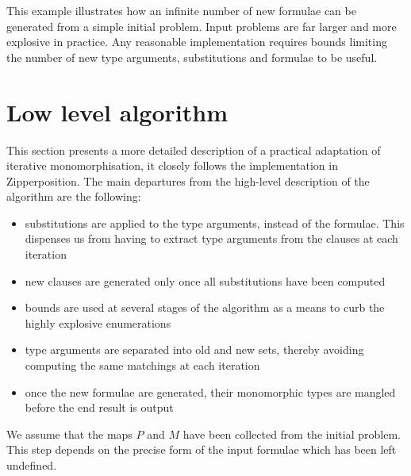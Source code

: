 \documentclass[]{ceurart}
\begin{document}
This example illustrates how an infinite number of new formulae can be generated from a simple initial problem. Input problems are far larger and more explosive in practice. Any reasonable implementation requires bounds limiting the number of new type arguments, substitutions and formulae to be useful.

\section{Low level algorithm}
\label{sec:low-level-algorithm}

This section presents a more detailed description of a practical adaptation of iterative monomorphisation, it closely follows the implementation in Zipperposition. The main departures from the high-level description of the algorithm are the following:
\begin{itemize}
   \item substitutions are applied to the type arguments, instead of the formulae. This dispenses us from having to extract type arguments from the clauses at each iteration
   \item new clauses are generated only once all substitutions have been computed
   \item bounds are used at several stages of the algorithm as a means to curb the highly explosive enumerations
   \item type arguments are separated into old and new sets, thereby avoiding computing the same matchings at each iteration
   \item once the new formulae are generated, their monomorphic types are mangled before the end result is output
\end{itemize}

We assume that the maps \(P\) and \(M\) have been collected from the initial problem. This step depends on the precise form of the input formulae which has been left undefined.
\end{document}
